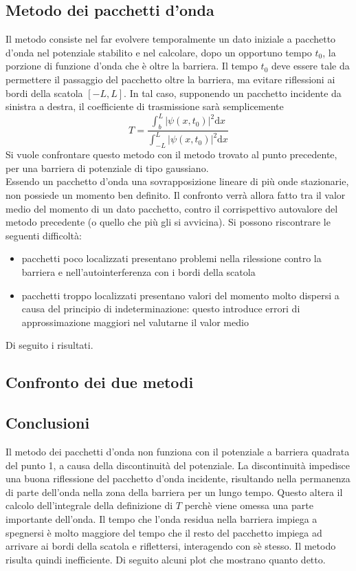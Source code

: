 \subsection*{Metodo dei pacchetti d'onda}
Il metodo consiste nel far evolvere temporalmente un dato iniziale a pacchetto
d'onda nel potenziale stabilito e nel calcolare, dopo un opportuno tempo $t_0$,
la porzione di funzione d'onda che è oltre la barriera. Il tempo $t_0$ deve essere tale
da permettere il passaggio del pacchetto oltre la barriera, ma evitare riflessioni
ai bordi della scatola $[-L,L]$.
In tal caso, supponendo un pacchetto incidente da sinistra a destra,
il coefficiente di trasmissione sarà semplicemente
    $$ T = \frac{\int_b^L |\psi(x,t_0)|^2\mathrm d x}{\int_{-L}^L |\psi(x,t_0)|^2\mathrm d x} $$
Si vuole confrontare questo metodo con il metodo trovato al punto precedente,
per una barriera di potenziale di tipo gaussiano.\\
Essendo un pacchetto d'onda una sovrapposizione lineare di più onde stazionarie,
non possiede un momento ben definito. Il confronto verrà allora fatto tra il valor medio
del momento di un dato pacchetto, contro il corrispettivo autovalore
del metodo precedente (o quello che più gli si avvicina).
Si possono riscontrare le seguenti difficoltà:
\begin{itemize}
    \item pacchetti poco localizzati presentano problemi nella rilessione contro la barriera
    e nell'autointerferenza con i bordi della scatola
    \item pacchetti troppo localizzati presentano valori del momento
    molto dispersi a causa del principio di indeterminazione:
    questo introduce errori di approssimazione maggiori nel valutarne il valor medio
\end{itemize}
\bigskip
Di seguito i risultati.\\
\subsection*{Confronto dei due metodi}

\subsection*{Conclusioni}
Il metodo dei pacchetti d'onda non funziona con il potenziale a barriera quadrata
del punto 1, a causa della discontinuità del potenziale. La discontinuità
impedisce una buona riflessione del pacchetto d'onda incidente, risultando nella
permanenza di parte dell'onda nella zona della barriera per un lungo tempo.
Questo altera il calcolo dell'integrale della definizione di $T$ perchè
viene omessa una parte importante dell'onda. Il tempo che l'onda residua nella barriera
impiega a spegnersi è molto maggiore del tempo che il resto del pacchetto impiega
ad arrivare ai bordi della scatola e riflettersi, interagendo con sè stesso.
Il metodo risulta quindi inefficiente. Di seguito alcuni plot che mostrano
quanto detto.
